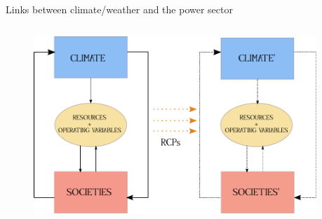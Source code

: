 \documentclass{beamer}%
\begin{document}
\begin{frame}[fragile]{Links between climate/weather and the power sector}
  \begin{columns}
    \begin{column}{0.7\textwidth}
  \begin{figure}
    \centering\includegraphics[scale=0.55]{drawing.pdf}
\end{figure}
  \end{column}
  \begin{column}{0.3\textwidth}
    \end{column}
    \end{columns}
\end{frame}
\end{document}
